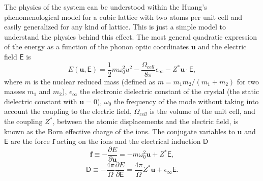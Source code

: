 The physics of the system can be understood within the Huang's phenomenological model\cite{born1954dynamical} for a cubic lattice with two atoms per unit cell and easily generalized for any kind of lattice. This is 
just a simple model to understand the physics behind this effect. The most general quadratic expression of the energy as a function of the phonon optic coordinates $\mathbf{u}$ and the electric field $\boldsymbol{\mathsf{E}}$ is
\begin{equation}
 E(\mathbf{u},\boldsymbol{\mathsf{E}})=\frac{1}{2}m\omega_{0}^{2}u^{2}-\frac{\Omega_{cell}}{8\pi}\epsilon_{\infty}-Z^{*}\mathbf{u}\cdot\boldsymbol{\mathsf{E}},
\end{equation}  
where $m$ is the nuclear reduced mass (defined as $m=m_{1}m_{2}/(m_{1}+m_{2})$ for two masses $m_{1}$ and $m_{2}$), $\epsilon_{\infty}$ the electronic dielectric constant of the crystal (the static dielectric constant 
with $\mathbf{u}=0$), $\omega_{0}$ the frequency of the mode without taking into account the coupling to the electric field, $\Omega_{cell}$ is the volume of the unit cell, and the coupling $Z^{*}$, between the atomic 
displacements and the electric field, is known as the Born effective charge of the ions. The conjugate variables to $\mathbf{u}$ and $\boldsymbol{\mathsf{E}}$ are the force $\mathbf{f}$ acting on the ions and the electrical 
induction $\boldsymbol{\mathsf{D}}$
\begin{equation}
 \label{conjugate-force}
 \mathbf{f}\equiv -\frac{\partial E}{\partial\mathbf{u}}=-m\omega_{0}^{2}\mathbf{u}+Z^{*}\boldsymbol{\mathsf{E}},
\end{equation}
\begin{equation}
 \label{conjugate-field}
 \boldsymbol{\mathsf{D}}\equiv -\frac{4\pi}{\Omega}\frac{\partial E}{\partial \boldsymbol{\mathsf{E}}}=\frac{4\pi}{\Omega}Z^{*}\mathbf{u}+\epsilon_{\infty}\boldsymbol{\mathsf{E}}.
\end{equation}

